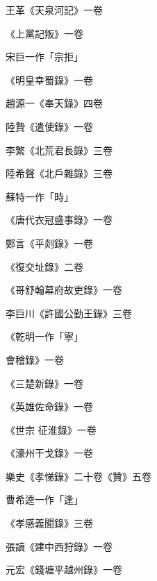 \begin{pinyinscope}
 王革《天泉河記》一卷



 《上黨記叛》一卷



 宋巨一作「宗拒」



 《明皇幸蜀錄》一卷



 趙源一《奉天錄》四卷



 陸贄《遣使錄》一卷



 李繁《北荒君長錄》三卷



 陸希聲《北戶雜錄》三卷



 蘇特一作「時」



 《唐代衣冠盛事錄》一卷



 鄭言《平剡錄》一卷



 《復交址錄》二卷



 《哥舒翰幕府故吏錄》一卷



 李巨川《許國公勤王錄》三卷



 《乾明一作「寧」



 會稽錄》一卷



 《三楚新錄》一卷



 《英雄佐命錄》一卷



 《世宗
 征淮錄》一卷



 《濠州干戈錄》一卷



 樂史《孝悌錄》二十卷《贊》五卷



 曹希逵一作「逢」



 《孝感義聞錄》三卷



 張讀《建中西狩錄》一卷



 元宏《錢塘平越州錄》一卷




\end{pinyinscope}
